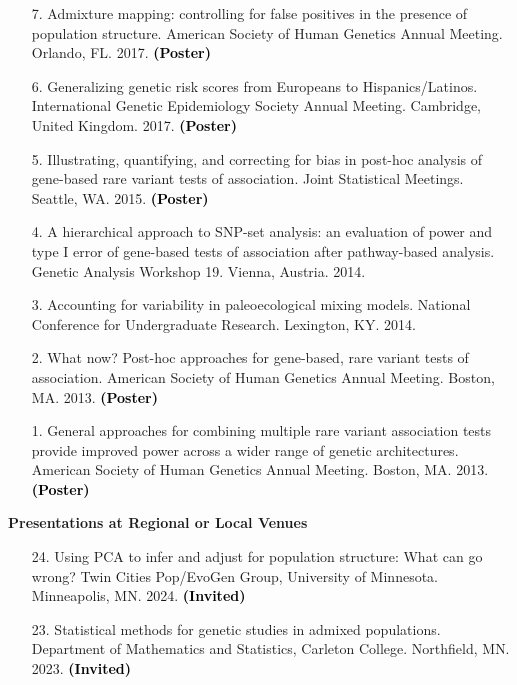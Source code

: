 \documentclass[margin]{res}
\newcommand{\annotate}[1]{\textcolor{black}{\textbf{(#1)}}}
\begin{document}
\begin{resume}
\begin{itemize}
\item[7.] Admixture mapping: controlling for false positives in the presence of population structure. 
American Society of Human Genetics Annual Meeting. Orlando, FL. 2017. 
\annotate{Poster}

\item[6.] Generalizing genetic risk scores from Europeans to Hispanics/Latinos. 
International Genetic Epidemiology Society Annual Meeting. Cambridge, United Kingdom. 2017. 
\annotate{Poster}

\item[5.] Illustrating, quantifying, and correcting for bias in post-hoc analysis of gene-based rare variant tests of association. 
Joint Statistical Meetings. Seattle, WA. 2015.
\annotate{Poster}

\item[4.] A hierarchical approach to SNP-set analysis: an evaluation of power and type I error of gene-based tests of association after pathway-based analysis. 
Genetic Analysis Workshop 19. Vienna, Austria. 2014.

\item[3.] Accounting for variability in paleoecological mixing models. 
National Conference for Undergraduate Research. Lexington, KY. 2014.

\item[2.] What now? Post-hoc approaches for gene-based, rare variant tests of association. 
American Society of Human Genetics Annual Meeting. Boston, MA. 2013. 
\annotate{Poster}

\item[1.] General approaches for combining multiple rare variant association tests provide improved power across a wider range of genetic architectures. 
American Society of Human Genetics Annual Meeting. Boston, MA. 2013. 
\annotate{Poster}

\end{itemize}





\textbf{Presentations at Regional or Local Venues} 

\begin{itemize}

\item[24.] Using PCA to infer and adjust for population structure: What can go wrong? 
Twin Cities Pop/EvoGen Group, University of Minnesota. Minneapolis, MN. 2024. 
\annotate{Invited}

\item[23.] Statistical methods for genetic studies in admixed populations. 
Department of Mathematics and Statistics, Carleton College. Northfield, MN. 2023. 
\annotate{Invited}


\end{itemize}
\end{resume}
\end{document}
